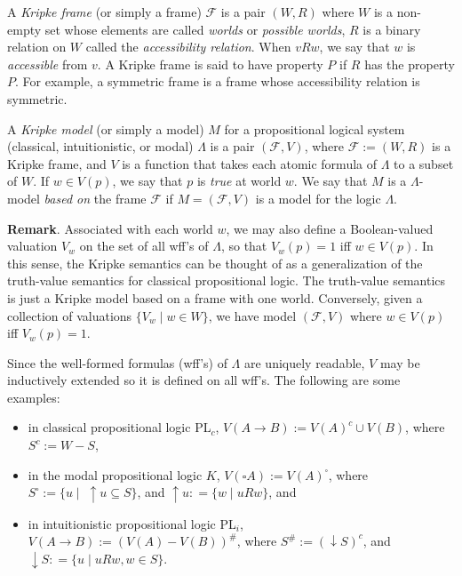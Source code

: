 \documentclass[12pt]{article}
\begin{document}
A \emph{Kripke frame} (or simply a frame) $\mathcal{F}$ is a pair $(W,R)$ where $W$ is a non-empty set whose elements are called \emph{worlds} or \emph{possible worlds}, $R$ is a binary relation on $W$ called the \emph{accessibility relation}.  When $v R w$, we say that $w$ is \emph{accessible} from $v$.  A Kripke frame is said to have property $P$ if $R$ has the property $P$.  For example, a symmetric frame is a frame whose accessibility relation is symmetric.

A \emph{Kripke model} (or simply a model) $M$ for a propositional logical system (classical, intuitionistic, or modal) $\Lambda$ is a pair $(\mathcal{F},V)$, where $\mathcal{F}:=(W,R)$ is a Kripke frame, and $V$ is a function that takes each atomic formula of $\Lambda$ to a subset of $W$.  If $w\in V(p)$, we say that $p$ is \emph{true} at world $w$.  We say that $M$ is a $\Lambda$-model \emph{based on} the frame $\mathcal{F}$ if $M=(\mathcal{F},V)$ is a model for the logic $\Lambda$.

\textbf{Remark}.  Associated with each world $w$, we may also define a Boolean-valued valuation $V_w$ on the set of all wff's of $\Lambda$, so that $V_w(p)=1$ iff $w \in V(p)$.  In this sense, the Kripke semantics can be thought of as a generalization of the truth-value semantics for classical propositional logic.  The truth-value semantics is just a Kripke model based on a frame with one world.  Conversely, given a collection of valuations $\lbrace V_w\mid w\in W\rbrace$, we have model $(\mathcal{F},V)$ where $w\in V(p)$ iff $V_w(p)=1$.

Since the well-formed formulas (wff's) of $\Lambda$ are uniquely readable, $V$ may be inductively extended so it is defined on all wff's.  The following are some examples:
\begin{itemize}
\item in classical propositional logic PL$_c$, $V(A\to B):=V(A)^c\cup V(B)$, where $S^c:=W-S$,
\item in the modal propositional logic $K$, $V(\square A):= V(A)^{\square}$, where $S^{\square}:=\lbrace u \mid\; \uparrow\!\! u \subseteq S \rbrace$, and $\uparrow\!\! u: =\lbrace w \mid u R w\rbrace$, and
\item in intuitionistic propositional logic PL$_i$, $V(A\to B):=(V(A)- V(B))^{\#}$, where $S^{\#}:=(\downarrow\!\! S)^c$, and $\downarrow\!\!S: = \lbrace u \mid u R w, w\in S\rbrace$.
\end{itemize}
\end{document}
